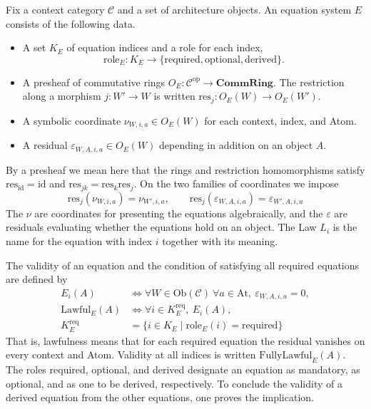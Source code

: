\begin{definition}\label{def:1.12}

Fix a context category $\mathcal{C}$ and a set of architecture objects.
An equation system $E$ consists of the following data.

\begin{itemize}
\item A set $K_E$ of equation indices and a role for each index,
\[
\mathrm{role}_E:K_E\to\{\mathrm{required},\mathrm{optional},\mathrm{derived}\}.
\]
\item A presheaf of commutative rings
$O_E:\mathcal{C}^{\mathrm{op}}\to{\mathbf{CommRing}}$.
The restriction along a morphism $j:W'\to W$ is written
$\mathrm{res}_j:O_E(W)\to O_E(W')$.
\item A symbolic coordinate $\nu_{W,i,a}\in O_E(W)$ for each context, index, and
Atom.
\item A residual $\varepsilon_{W,A,i,a}\in O_E(W)$ depending in addition on an
object $A$.
\end{itemize}

By a presheaf we mean here that the rings and restriction homomorphisms satisfy
$\mathrm{res}_{\mathrm{id}}=\mathrm{id}$ and
$\mathrm{res}_{jk}=\mathrm{res}_k\mathrm{res}_j$.
On the two families of coordinates we impose
\begin{equation*}
\mathrm{res}_j(\nu_{W,i,a})=\nu_{W',i,a},
\qquad
\mathrm{res}_j(\varepsilon_{W,A,i,a})=\varepsilon_{W',A,i,a}
\tag{1.1}\label{eq:1.1}
\end{equation*}
The $\nu$ are coordinates for presenting the equations algebraically, and the
$\varepsilon$ are residuals evaluating whether the equations hold on an object.
The Law $L_i$ is the name for the equation with index $i$ together with its
meaning.

\end{definition}

\begin{definition}[Lawfulness]\label{def:1.13}

The validity of an equation and the condition of satisfying all required
equations are defined by
\[
\begin{aligned}
E_i(A)
&\Longleftrightarrow
\forall W\in\mathrm{Ob}(\mathcal{C})\ \forall a\in\mathrm{At},\
\varepsilon_{W,A,i,a}=0,\\
\mathrm{Lawful}_E(A)
&\Longleftrightarrow
\forall i\in K_E^{\mathrm{req}},\ E_i(A),\\
K_E^{\mathrm{req}}
&=\{i\in K_E\mid\mathrm{role}_E(i)=\mathrm{required}\}
\end{aligned}
\]
That is, lawfulness means that for each required equation the residual vanishes
on every context and Atom. Validity at all indices is written
$\mathrm{FullyLawful}_E(A)$.
The roles required, optional, and derived designate an equation as mandatory, as
optional, and as one to be derived, respectively.
To conclude the validity of a derived equation from the other equations, one
proves the implication.

\end{definition}


